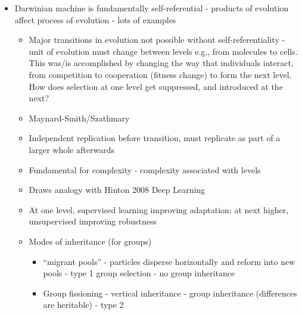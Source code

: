 \begin{itemize}
	\item
	
	Darwinian machine is fundamentally self-referential - products of
	evolution affect process of evolution - lots of examples
	
	
	\begin{itemize}
		\item
		
		Major transitions in evolution not possible without
		self-referentiality - unit of evolution must change between levels
		e.g., from molecules to cells. This was/is accomplished by changing
		the way that individuals interact, from competition to cooperation
		(fitness change) to form the next level. How does selection at one
		level get suppressed, and introduced at the next?
		
		\item
		
		Maynard-Smith/Szathmary
		
		\item
		
		Independent replication before transition, must replicate as part of
		a larger whole afterwards
		
		\item
		
		Fundamental for complexity - complexity associated with levels
		
		\item
		
		Draws analogy with Hinton 2008 Deep Learning
		
		\item
		
		At one level, supervised learning improving adaptation; at next
		higher, unsupervised improving robustness
		
		\item
		
		Modes of inheritance (for groups)
		
		
		\begin{itemize}
			\item
			
			``migrant pools'' - particles disperse horizontally and reform
			into new pools - type 1 group selection - no group inheritance
			
			\item
			
			Group fissioning - vertical inheritance - group inheritance
			(differences are heritable) - type 2
			
		\end{itemize}
	\end{itemize}
\end{itemize}




